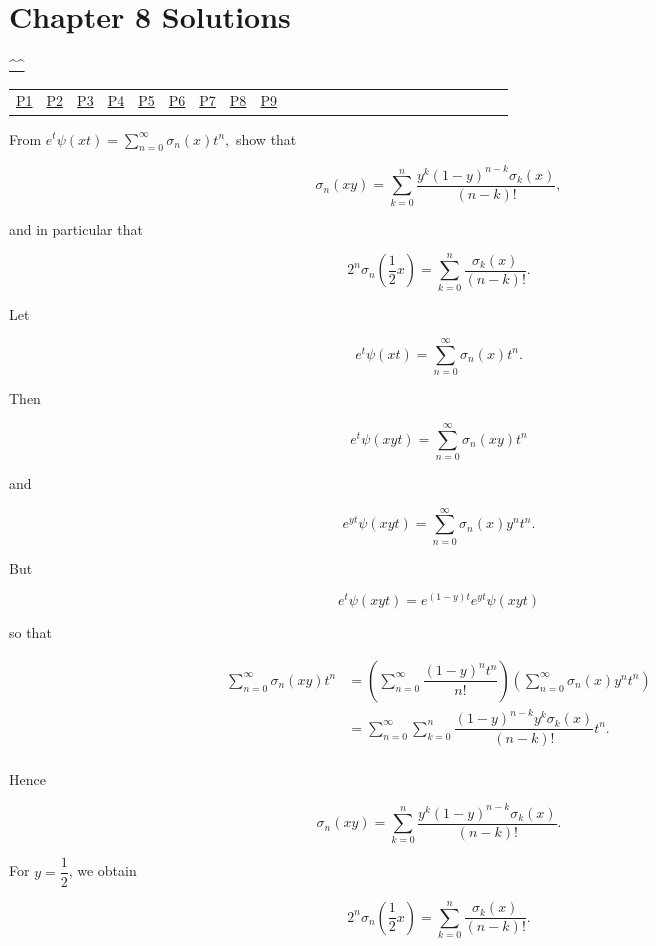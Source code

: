 \section{Chapter 8 Solutions}
\begin{center}\hyperref[toc]{\^{}\^{}}\end{center}
\begin{center}\begin{tabular}{lllllllllllllllllllllllll}
\hyperref[problem1chapter8]{P1} & \hyperref[problem2chapter8]{P2} & \hyperref[problem3chapter8]{P3} & \hyperref[problem4chapter8]{P4} & \hyperref[problem5chapter8]{P5} & \hyperref[problem6chapter8]{P6} & \hyperref[problem7chapter8]{P7} & \hyperref[problem8chapter8]{P8} & \hyperref[problem9chapter8]{P9}
\end{tabular}\end{center}
\setcounter{problem}{0}
\setcounter{solution}{0}
\begin{problem}\label{problem1chapter8}
From $e^t \psi(xt) = \displaystyle\sum_{n=0}^{\infty} \sigma_n(x)t^n,$ show that

$$\sigma_n(xy) = \displaystyle\sum_{k=0}^n \dfrac{y^k (1-y)^{n-k} \sigma_k(x)}{(n-k)!},$$

and in particular that

$$2^n \sigma_n \left( \dfrac{1}{2} x \right) = \displaystyle\sum_{k=0}^n \dfrac{\sigma_k(x)}{(n-k)!}.$$
\end{problem}
\begin{solution}
Let 

$$e^t \psi(xt) = \displaystyle\sum_{n=0}^{\infty} \sigma_n(x)t^n.$$

Then

$$e^t \psi(xyt) = \displaystyle\sum_{n=0}^{\infty} \sigma_n(xy)t^n$$

and

$$e^{yt} \psi(xyt) = \displaystyle\sum_{n=0}^{\infty} \sigma_n(x) y^n t^n.$$

But

$$e^t \psi(xyt) = e^{(1-y)t} e^{yt} \psi(xyt)$$

so that

$$\begin{array}{ll}
\displaystyle\sum_{n=0}^{\infty} \sigma_n(xy)t^n &= \left( \displaystyle\sum_{n=0}^{\infty} \dfrac{(1-y)^n t^n}{n!} \right) \left( \displaystyle\sum_{n=0}^{\infty} \sigma_n(x) y^n t^n \right)\\ 
&= \displaystyle\sum_{n=0}^{\infty} \displaystyle\sum_{k=0}^n \dfrac{(1-y)^{n-k} y^k \sigma_k(x)}{(n-k)!} t^n. \\
\end{array}$$

Hence

$$\sigma_n(xy) = \displaystyle\sum_{k=0}^n \dfrac{y^k (1-y)^{n-k} \sigma_k(x)}{(n-k)!}.$$

For $y = \dfrac{1}{2}$, we obtain

$$2^n \sigma_n \left( \dfrac{1}{2} x \right) = \displaystyle\sum_{k=0}^n \dfrac{\sigma_k(x)}{(n-k)!}.$$
\end{solution}

